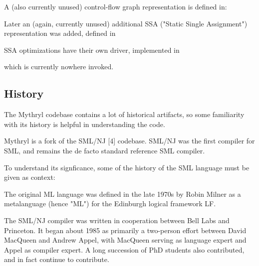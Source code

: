 A (also currently unused) control-flow graph representation is defined in: 

\begin{quote}
\end{quote}

Later an (again, currently unused) additional SSA ("Static Single Assignment") 
representation was added, defined in

\begin{quote}
\end{quote}

SSA optimizations have their own driver, implemented in

\begin{quote}
\end{quote}

which is currently nowhere invoked.

\cutend*


\subsection{History}
\label{section:compiler:history}

The Mythryl codebase contains a lot of historical 
artifacts, so some familiarity with its history is 
helpful in understanding the code.

Mythryl is a fork of the SML/NJ [4] codebase.  SML/NJ 
was the first compiler for SML, and remains the de 
facto standard reference SML compiler.

To understand its signficance, some of the history of 
the SML language must be given as context:

The original ML language was defined in the late 
1970s by Robin Milner as a metalanguage (hence "ML") 
for the Edinburgh logical framework LF.

The SML/NJ compiler was written in cooperation between 
Bell Labs and Princeton.  It began about 1985 as primarily 
a two-person effort between David MacQueen and Andrew Appel, 
with MacQueen serving as language expert and Appel as compiler 
expert.  A long succession of PhD students also contributed, 
and in fact continue to contribute.

